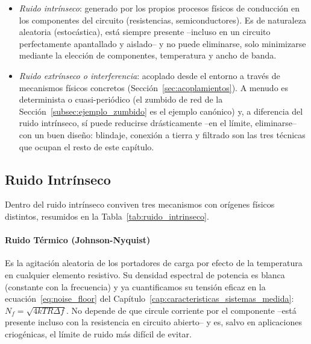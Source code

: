 \begin{itemize}
    \item \emph{Ruido intrínseco}: generado por los propios procesos físicos de conducción en los componentes del circuito (resistencias, semiconductores). Es de naturaleza aleatoria (estocástica), está siempre presente --incluso en un circuito perfectamente apantallado y aislado-- y no puede eliminarse, solo minimizarse mediante la elección de componentes, temperatura y ancho de banda.
    \item \emph{Ruido extrínseco o interferencia}: acoplado desde el entorno a través de mecanismos físicos concretos (Sección~\ref{sec:acoplamientos}). A menudo es determinista o cuasi-periódico (el zumbido de red de la Sección~\ref{subsec:ejemplo_zumbido} es el ejemplo canónico) y, a diferencia del ruido intrínseco, sí puede reducirse drásticamente --en el límite, eliminarse-- con un buen diseño: blindaje, conexión a tierra y filtrado son las tres técnicas que ocupan el resto de este capítulo.
\end{itemize}

\subsection{Ruido Intrínseco}\label{sub:ruido_intrinseco}

Dentro del ruido intrínseco conviven tres mecanismos con orígenes físicos distintos, resumidos en la Tabla~\ref{tab:ruido_intrinseco}.



\paragraph{Ruido Térmico (Johnson-Nyquist)}
Es la agitación aleatoria de los portadores de carga por efecto de la temperatura en cualquier elemento resistivo. Su densidad espectral de potencia es blanca (constante con la frecuencia) y ya cuantificamos su tensión eficaz en la ecuación~\eqref{eq:noise_floor} del Capítulo~\ref{cap:caracteristicas_sistemas_medida}: $N_f = \sqrt{4kTR\Delta f}$. No depende de que circule corriente por el componente --está presente incluso con la resistencia en circuito abierto-- y es, salvo en aplicaciones criogénicas, el límite de ruido más difícil de evitar.


